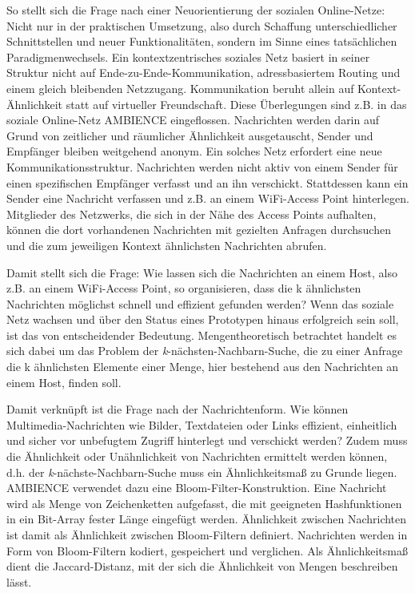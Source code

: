 So stellt sich die Frage nach einer Neuorientierung der sozialen Online-Netze: Nicht nur in der praktischen Umsetzung, also durch Schaffung unterschiedlicher Schnittstellen und neuer Funktionalitäten, sondern im  Sinne eines tatsächlichen Paradigmenwechsels. Ein kontextzentrisches soziales Netz basiert in seiner Struktur nicht auf Ende-zu-Ende-Kommunikation, adressbasiertem  Routing und einem gleich bleibenden Netzzugang. Kommunikation beruht allein auf Kontext-Ähnlichkeit statt auf virtueller Freundschaft. Diese Überlegungen sind z.B. in das soziale Online-Netz AMBIENCE eingeflossen. Nachrichten werden darin auf Grund von zeitlicher und räumlicher Ähnlichkeit ausgetauscht, Sender und Empfänger bleiben weitgehend anonym. Ein solches Netz erfordert eine neue Kommunikationsstruktur. Nachrichten werden nicht aktiv von einem Sender für einen spezifischen Empfänger verfasst und an ihn verschickt. Stattdessen kann ein Sender eine Nachricht verfassen und z.B. an einem WiFi-Access Point hinterlegen. Mitglieder des Netzwerks, die sich in der Nähe des Access Points aufhalten, können die dort vorhandenen Nachrichten mit gezielten Anfragen durchsuchen und die zum jeweiligen Kontext ähnlichsten Nachrichten abrufen. 

Damit stellt sich die Frage: Wie lassen sich die Nachrichten an einem Host, also z.B. an einem WiFi-Access Point, so organisieren, dass die k ähnlichsten Nachrichten möglichst schnell und effizient gefunden werden?  Wenn das soziale Netz wachsen und über den Status eines Prototypen hinaus erfolgreich sein soll, ist das von entscheidender Bedeutung. Mengentheoretisch betrachtet handelt es sich dabei um das Problem der \textit{k}-nächsten-Nachbarn-Suche, die zu einer Anfrage die k ähnlichsten Elemente einer Menge, hier bestehend aus den Nachrichten an einem Host, finden soll. 

Damit verknüpft ist die Frage nach der Nachrichtenform. Wie können Multimedia-Nach\-rich\-ten wie Bilder, Textdateien oder Links effizient, einheitlich und sicher vor unbefugtem Zugriff hinterlegt und verschickt werden? Zudem muss die Ähnlichkeit oder Unähnlichkeit von Nachrichten ermittelt werden können, d.h. der \textit{k}-nächste-Nachbarn-Suche muss ein Ähnlichkeitsmaß zu Grunde liegen. AMBIENCE verwendet dazu eine Bloom-Filter-Konstruktion. Eine Nachricht wird als Menge von Zeichenketten aufgefasst, die mit geeigneten Hashfunktionen in ein Bit-Array fester Länge eingefügt werden. Ähnlichkeit zwischen Nachrichten ist damit als Ähnlichkeit zwischen Bloom-Filtern definiert. Nachrichten werden in Form von Bloom-Filtern kodiert, gespeichert und verglichen. Als Ähnlichkeitsmaß dient die Jaccard-Distanz, mit der sich die Ähnlichkeit von Mengen beschreiben lässt. 

